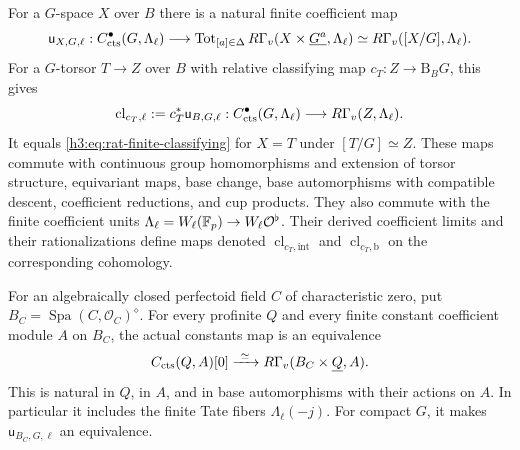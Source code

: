 \begin{lemma}\label{h3:rat:finite-classifying}
For a $G$-space $X$ over $B$ there is a natural finite coefficient map
\begin{equation}\label{h3:eq:rat-finite-classifying}
 \mathsf u_{X,G,\ell}:
 C^\bullet_{\mathrm{cts}}(G,\Lambda_\ell)
 \longrightarrow
 \operatorname{Tot}_{[a]\in\Delta}
 R\Gamma_v(X\times\underline{G^a},\Lambda_\ell)
 \simeq R\Gamma_v([X/G],\Lambda_\ell).
\end{equation}
For a $G$-torsor $T\to Z$ over $B$ with relative classifying map
$c_T:Z\to\mathrm B_B G$, this gives
\[
 \operatorname{cl}_{c_T,\ell}
   :=c_T^*\mathsf u_{B,G,\ell}:
 C^\bullet_{\mathrm{cts}}(G,\Lambda_\ell)
       \longrightarrow R\Gamma_v(Z,\Lambda_\ell).
\]
It equals \eqref{h3:eq:rat-finite-classifying} for $X=T$ under
$[T/G]\simeq Z$.  These maps commute with continuous group
homomorphisms and extension of torsor structure, equivariant maps,
base change, base automorphisms with compatible descent, coefficient
reductions, and cup products.  They also commute with the finite
coefficient units $\Lambda_\ell=W_\ell(\mathbb F_p)\to W_\ell\mathcal O^\flat$.
Their derived coefficient limits and their rationalizations define
maps denoted $\operatorname{cl}_{c_T,\mathrm{int}}$ and
$\operatorname{cl}_{c_T,\mathrm b}$ on the corresponding cohomology.

For an algebraically closed perfectoid field $C$ of characteristic zero, put
$B_C=\operatorname{Spa}(C,\mathcal O_C)^\diamond$.  For every
profinite $Q$ and every finite constant coefficient module $A$ on
$B_C$, the actual constants map is an equivalence
\begin{equation}\label{h3:eq:rat-geometric-point-constants}
 C_{\mathrm{cts}}(Q,A)[0]
       \xrightarrow{\ \simeq\ }
 R\Gamma_v(B_C\times\underline Q,A).
\end{equation}
This is natural in $Q$, in $A$, and in base automorphisms with their
actions on $A$.  In particular it includes the finite Tate fibers
$\Lambda_\ell(-j)$.  For compact $G$, it makes
$\mathsf u_{B_C,G,\ell}$ an equivalence.
\end{lemma}

